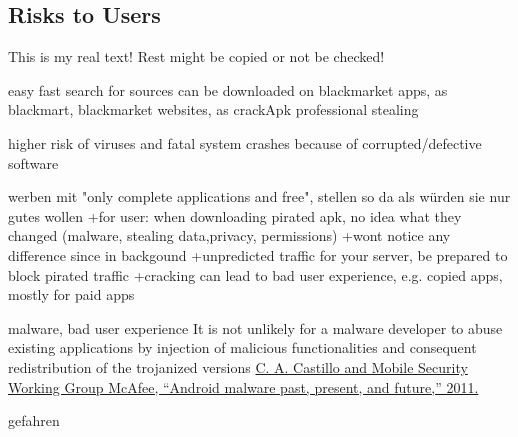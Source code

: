 \subsection{Risks to Users} \label{subsection:foundation-piracy-users}
This is my real text! Rest might be copied or not be checked!

easy fast search for sources
can be downloaded on blackmarket apps, as blackmart\cite{blackmartStore}, blackmarket websites, as crackApk\cite{crackApk}
professional stealing

higher risk of viruses and fatal system crashes because of corrupted/defective software

werben mit "only complete applications and free", stellen so da als würden sie nur gutes wollen
+for user: when downloading pirated apk, no idea what they changed (malware, stealing data,privacy, permissions)\newline
+wont notice any difference since in backgound\newline
+unpredicted traffic for your server, be prepared to block pirated traffic\newline
+cracking can lead to bad user experience, e.g. copied apps, mostly for paid apps\newline

malware, bad user experience\newline
It is not unlikely for a malware developer to abuse existing applications by injection of malicious functionalities and consequent redistribution of the trojanized versions \url{C. A. Castillo and Mobile Security Working Group McAfee, “Android malware past, present, and future,” 2011.}

gefahren\cite{bitdefenderPlagiarism}
